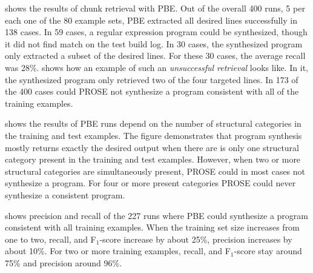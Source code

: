 shows the results of chunk
retrieval with PBE.
Out of the overall 400 runs, 5 per each one of the 80 example
sets, PBE extracted all desired lines successfully in 138 cases.
In 59 cases, a regular expression program could be synthesized, though
it did not find match on the test build log.
In 30 cases, the synthesized program only extracted a
subset of the desired lines.
For these 30 cases, the average recall
was 28\%.
 shows how an example of such
an \emph{unsuccessful retrieval} looks like.
In it, the synthesized program only
retrieved two of the four targeted lines.
In 173 of the 400 cases
could PROSE not synthesize a program consistent with all of the training
examples.


 shows the results of PBE
runs depend on the number of structural categories in the training and
test examples.
The figure demonstrates that program synthesis mostly
returns exactly the desired output when there are is only one
structural category present in the training and test examples.
However, when
two or more structural categories are simultaneously present,
PROSE could in most cases not synthesize a program.
For four or more present
categories PROSE could never synthesize a consistent program.

 shows
precision and recall of the 227 runs where PBE could synthesize a
program consistent with all training examples.
When the training set
size increases from one to two, recall, and F$_{1}$-score increase by
about 25\%, precision increases by about 10\%.
For two or more
training examples, recall, and F$_{1}$-score stay around 75\% and
precision around 96\%.


